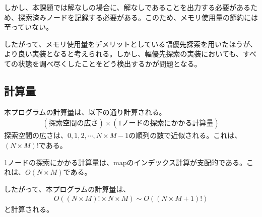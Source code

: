\documentclass[a4paper,11pt]{ltjsarticle}
\begin{document}
しかし、本課題では解なしの場合に、解なしであることを出力する必要があるため、探索済みノードを記録する必要がある。このため、メモリ使用量の節約には至っていない。

したがって、メモリ使用量をデメリットとしている幅優先探索を用いたほうが、より良い実装となると考えられる。しかし、幅優先探索の実装においても、すべての状態を調べ尽くしたことをどう検出するかが問題となる。

\subsection{計算量}
本プログラムの計算量は、以下の通り計算される。
\begin{align*}
  (探索空間の広さ) \times (1ノードの探索にかかる計算量)
\end{align*}
探索空間の広さは、$0,1,2,\cdots,N\times M-1$の順列の数で近似される。これは、$(N\times M)!$である。

1ノードの探索にかかる計算量は、mapのインデックス計算が支配的である。これは、$O(N \times M)$である。

したがって、本プログラムの計算量は、
\begin{align*}
  O((N\times M)! \times N \times M) \sim   O((N\times M+1)!)
\end{align*}
と計算される。
\end{document}
